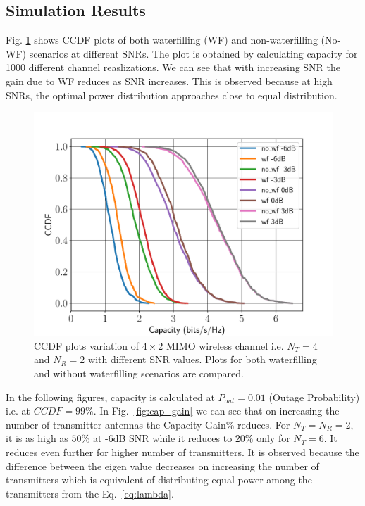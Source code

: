 \documentclass[11pt,a4paper]{report}
\def\imwidth{0.60}
\begin{document}
\subsection{Simulation Results}
Fig. \ref{fig:ccdf} shows CCDF plots of both waterfilling (WF)
and non-waterfilling (No-WF) scenarios at different SNRs. The plot is obtained by 
calculating capacity for 1000 different channel reaslizations. We can see that
with increasing SNR the gain due to WF reduces as SNR increases. This
is observed because at high SNRs, the optimal power distribution approaches
close to equal distribution.
\begin{figure}
\begin{center}
\includegraphics[width=\imwidth\columnwidth]{images/ccdf.pdf}
\caption{CCDF plots variation of $4\times2$ MIMO wireless channel i.e. $N_T=4$
and $N_R=2$ with different SNR values. Plots for both waterfilling and 
without waterfilling scenarios are compared.}
\label{fig:ccdf}
\end{center}
\end{figure}

In the following figures, capacity is calculated at $P_{out}=0.01$ (Outage Probability)
i.e. at $CCDF=99\%$.
In Fig.~\ref{fig:cap_gain} we can see that on increasing the number of transmitter
antennas the Capacity Gain$\%$ reduces. For $N_T=N_R=2$, it is as high as $50\%$
at -6dB SNR while it reduces to $20\%$ only for $N_T=6$. It reduces even further
for higher number of transmitters. It is observed because the difference between 
the eigen value decreases on increasing the number of transmitters which is
equivalent of distributing equal power among the transmitters from the Eq.~\ref{eq:lambda}.
\end{document}
